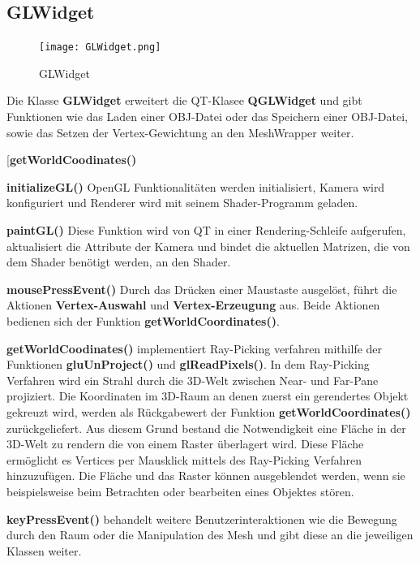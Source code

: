 \subsection{GLWidget}


	\begin{figure}[H]
	\centering
	\texttt{[image: GLWidget.png]}
	\caption{GLWidget}
	\label{fig2}
	\end{figure}
	
	Die Klasse \textbf{GLWidget} erweitert die QT-Klasee \textbf{QGLWidget} und gibt Funktionen wie das Laden einer OBJ-Datei oder das Speichern einer OBJ-Datei, sowie das Setzen der Vertex-Gewichtung an den MeshWrapper weiter.\newline\newline

	\begin{labeling}[]{[\textbf{getWorldCoodinates()}}%
	\item[\textbf{initializeGL()}] OpenGL Funktionalitäten werden initialisiert, Kamera wird konfiguriert und Renderer wird mit seinem Shader-Programm geladen.
	\item[\textbf{paintGL()}] Diese Funktion wird von QT in einer Rendering-Schleife aufgerufen, aktualisiert die Attribute der Kamera und bindet  die aktuellen Matrizen, die von dem Shader benötigt werden, an den Shader.
	\item[\textbf{mousePressEvent()}] Durch das Drücken einer Maustaste ausgelöst, führt die Aktionen \textbf{Vertex-Auswahl} und \textbf{Vertex-Erzeugung} aus. Beide Aktionen bedienen sich der Funktion \textbf{getWorldCoordinates()}.
	\item[\textbf{getWorldCoodinates()}]  implementiert Ray-Picking verfahren mithilfe der Funktionen \textbf{gluUnProject()} und \textbf{glReadPixels()}. In dem Ray-Picking Verfahren wird ein Strahl durch die 3D-Welt zwischen Near- und Far-Pane projiziert. Die Koordinaten im 3D-Raum an denen zuerst ein gerendertes Objekt gekreuzt wird, werden als Rückgabewert der Funktion \textbf{getWorldCoordinates()} zurückgeliefert. Aus diesem Grund bestand die Notwendigkeit eine Fläche in der 3D-Welt zu rendern die von einem Raster überlagert wird. Diese Fläche ermöglicht es Vertices per Mausklick mittels des Ray-Picking Verfahren hinzuzufügen. Die Fläche und das Raster können ausgeblendet werden, wenn sie beispielsweise beim Betrachten oder bearbeiten eines Objektes stören.
	\item[\textbf{keyPressEvent()}] behandelt weitere Benutzerinteraktionen wie die Bewegung durch den Raum oder die Manipulation des Mesh und gibt diese an die jeweiligen Klassen weiter.
	\end{labeling}

